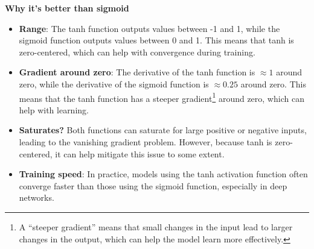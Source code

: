 \highspace
\begin{flushleft}
    \textcolor{Green3}{ \textbf{Why it's better than sigmoid}}
\end{flushleft}
\begin{itemize}
    \item \textbf{Range}: The tanh function outputs values between -1 and 1, while the sigmoid function outputs values between 0 and 1. This means that tanh is zero-centered, which can help with convergence during training.
    \item \textbf{Gradient around zero}: The derivative of the tanh function is $\approx 1$ around zero, while the derivative of the sigmoid function is $\approx 0.25$ around zero. This means that the tanh function has a steeper gradient\footnote{%
        A ``steeper gradient'' means that small changes in the input lead to larger changes in the output, which can help the model learn more effectively.
    } around zero, which can help with learning.
    \item \textbf{Saturates?} Both functions can saturate for large positive or negative inputs, leading to the vanishing gradient problem. However, because tanh is zero-centered, it can help mitigate this issue to some extent.
    \item \textbf{Training speed}: In practice, models using the tanh activation function often converge faster than those using the sigmoid function, especially in deep networks.
\end{itemize}
